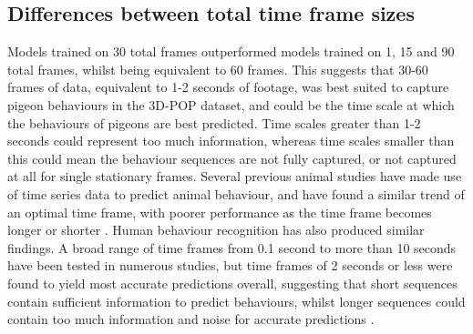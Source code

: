 \documentclass[11pt, letterpaper]{article} %
\begin{document}

\subsection{Differences between total time frame sizes}
Models trained on 30 total frames outperformed models trained on 1, 15 and 90 total frames, whilst being equivalent to 60 frames. This suggests that 30-60 frames of data, equivalent to 1-2 seconds of footage, was best suited to capture pigeon behaviours in the 3D-POP dataset, and could be the time scale at which the behaviours of pigeons are best predicted. Time scales greater than 1-2 seconds could represent too much information, whereas time scales smaller than this could mean the behaviour sequences are not fully captured, or not captured at all for single stationary frames.
%
Several previous animal studies have made use of time series data to predict animal behaviour, and have found a similar trend of an optimal time frame, with poorer performance as the time frame becomes longer or shorter \citep{sheep_timeseries_2018, RNN_window_2019}.
%
Human behaviour recognition has also produced similar findings. A broad range of time frames from 0.1 second to more than 10 seconds have been tested in numerous studies, but time frames of 2 seconds or less were found to yield most accurate predictions overall, suggesting that short sequences contain sufficient information to predict behaviours, whilst longer sequences could contain too much information and noise for accurate predictions \citep{banos_window_2014}. \\
\end{document}

